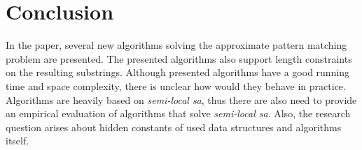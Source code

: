\section{Conclusion}
\label{section:conclusion}

In the paper, several new algorithms solving the approximate pattern matching problem are presented.
The presented algorithms also support length constraints on the resulting substrings.
Although presented algorithms have a good running time and space complexity, there is unclear how would they behave in practice.
Algorithms are heavily based on \emph{semi-local sa}, thus there are also need to provide an empirical evaluation of algorithms that solve \emph{semi-local sa}.
Also, the research question arises about hidden constants of used data structures and algorithms itself.  


